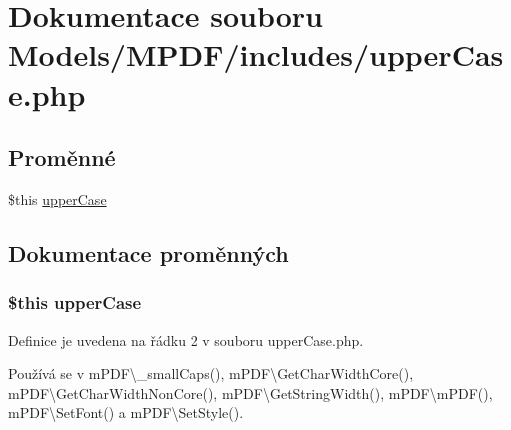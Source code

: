 \hypertarget{upper_case_8php}{\section{Dokumentace souboru Models/\-M\-P\-D\-F/includes/upper\-Case.php}
\label{upper_case_8php}
}
\subsection*{Proměnné}
\begin{DoxyCompactItemize}
\item 
\$this \hyperlink{upper_case_8php_a6719fde85f39a265f53d24f431f8829c}{upper\-Case}
\end{DoxyCompactItemize}


\subsection{Dokumentace proměnných}
\hypertarget{upper_case_8php_a6719fde85f39a265f53d24f431f8829c}{
\subsubsection[{upper\-Case}]{\setlength{\rightskip}{0pt plus 5cm}\$this upper\-Case}}\label{upper_case_8php_a6719fde85f39a265f53d24f431f8829c}


Definice je uvedena na řádku 2 v souboru upper\-Case.\-php.



Používá se v m\-P\-D\-F\textbackslash{}\-\_\-small\-Caps(), m\-P\-D\-F\textbackslash{}\-Get\-Char\-Width\-Core(), m\-P\-D\-F\textbackslash{}\-Get\-Char\-Width\-Non\-Core(), m\-P\-D\-F\textbackslash{}\-Get\-String\-Width(), m\-P\-D\-F\textbackslash{}m\-P\-D\-F(), m\-P\-D\-F\textbackslash{}\-Set\-Font() a m\-P\-D\-F\textbackslash{}\-Set\-Style().


